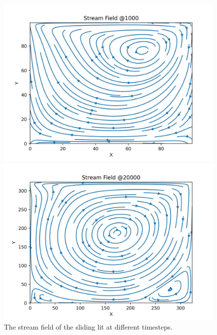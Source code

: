 \begin{figure}[H]
    \begin{minipage}{0.5\textwidth}
        \includegraphics[width=\linewidth]{graphs/SlidingLit/stream_field_1000}
    \end{minipage}%
    \begin{minipage}{0.5\textwidth}
        \includegraphics[width=\linewidth]{graphs/SlidingLit/stream_field_20000}
    \end{minipage}
    \caption{
        The stream field of the sliding lit at different timesteps.
    }
    \label{fig:sl-stream-field}
\end{figure}

